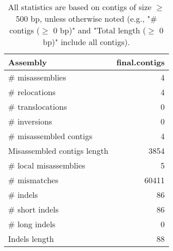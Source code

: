 \documentclass[12pt,a4paper]{article}
\begin{document}
\begin{table}[ht]
\begin{center}
\caption{All statistics are based on contigs of size $\geq$ 500 bp, unless otherwise noted (e.g., "\# contigs ($\geq$ 0 bp)" and "Total length ($\geq$ 0 bp)" include all contigs).}
\begin{tabular}{|l*{1}{|r}|}
\hline
Assembly & final.contigs \\ \hline
\# misassemblies & 4 \\ \hline
\hspace{5mm}\# relocations & 4 \\ \hline
\hspace{5mm}\# translocations & 0 \\ \hline
\hspace{5mm}\# inversions & 0 \\ \hline
\# misassembled contigs & 4 \\ \hline
Misassembled contigs length & 3854 \\ \hline
\# local misassemblies & 5 \\ \hline
\# mismatches & 60411 \\ \hline
\# indels & 86 \\ \hline
\hspace{5mm}\# short indels & 86 \\ \hline
\hspace{5mm}\# long indels & 0 \\ \hline
Indels length & 88 \\ \hline
\end{tabular}
\end{center}
\end{table}
\end{document}
